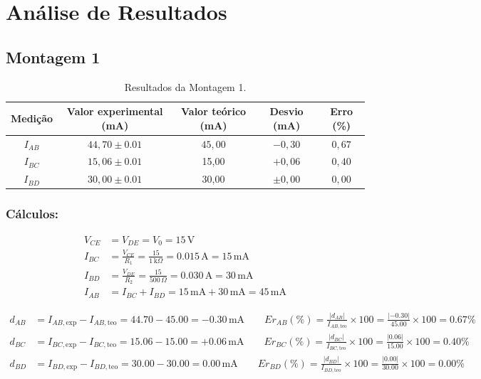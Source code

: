 \section{Análise de Resultados}

\subsection{Montagem 1}

\begin{table}[ht!]
	\centering
	\caption{Resultados da Montagem 1.}
	\begin{tabular}{|c|c|c|c|c|}
		\hline
		\textbf{Medição} & \textbf{Valor experimental (mA)} & \textbf{Valor teórico (mA)} & \textbf{Desvio (mA)} & \textbf{Erro (\%)} \\
		\hline
		$I_{AB}$         & $44,70 \pm 0.01$                 & $45,00$                     & $-0,30$              & $0,67$             \\
		\hline
		$I_{BC}$         & $15,06 \pm 0.01$                 & 15,00                       & $+0,06$              & $0,40$              \\
		\hline
		$I_{BD}$         & $30,00 \pm 0.01$                 & 30,00                       & $ \pm 0,00$          & $0,00$             \\
		\hline
	\end{tabular}
\end{table}

\subsubsection{Cálculos:}
\[
\begin{aligned}
V_{CE}&=V_{DE}=V_0=15\,\mathrm{V} \\
I_{BC}&=\frac{V_{CE}}{R_1}=\frac{15}{1\,\mathrm{k}\Omega}=0.015\,\mathrm{A}=15\,\mathrm{mA} \\
I_{BD}&=\frac{V_{DE}}{R_2}=\frac{15}{500\,\Omega}=0.030\,\mathrm{A}=30\,\mathrm{mA} \\
I_{AB}&=I_{BC}+I_{BD}=15\,\mathrm{mA}+30\,\mathrm{mA}=45\,\mathrm{mA}
\end{aligned}
\]

\[
\begin{aligned}
d_{AB}&=I_{AB,\mathrm{exp}}-I_{AB,\mathrm{teo}}
=44.70-45.00=-0.30\,\mathrm{mA}
\qquad
Er_{AB}(\%)=\frac{|d_{AB}|}{I_{AB,\mathrm{teo}}}\times100
=\frac{|-0.30|}{45.00}\times100=0.67\% \\[6pt]
d_{BC}&=I_{BC,\mathrm{exp}}-I_{BC,\mathrm{teo}}
=15.06-15.00=+0.06\,\mathrm{mA}
\qquad
Er_{BC}(\%)=\frac{|d_{BC}|}{I_{BC,\mathrm{teo}}}\times100
=\frac{|0.06|}{15.00}\times100=0.40\% \\[6pt]
d_{BD}&=I_{BD,\mathrm{exp}}-I_{BD,\mathrm{teo}}
=30.00-30.00=0.00\,\mathrm{mA}
\qquad
Er_{BD}(\%)=\frac{|d_{BD}|}{I_{BD,\mathrm{teo}}}\times100
=\frac{|0.00|}{30.00}\times100=0.00\%
\end{aligned}
\]
